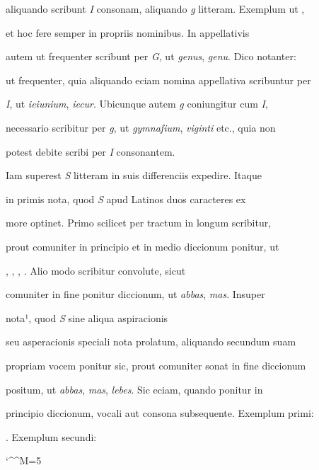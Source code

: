 aliquando scribunt \textit{I} consonam, aliquando \textit{g} litteram. Exemplum ut ,

 et hoc fere semper in propriis nominibus. In appellativis

autem ut frequenter scribunt per \textit{G}, ut \textit{genus}, \textit{genu}. Dico notanter:

ut frequenter, quia aliquando eciam nomina appellativa scribuntur per 

\textit{I}, ut \textit{ieiunium}, \textit{iecur}. Ubicunque autem \textit{g} coniungitur cum \textit{I},

necessario scribitur per \textit{g}, ut \textit{gymnaſium}, \textit{viginti} etc., quia non


potest debite scribi per \textit{I} consonantem.


\indentK Iam superest \textit{S} litteram in suis differenciis expedire. Itaque 

\fulllines

in primis nota, quod \textit{S} apud Latinos duos caracteres ex

more optinet. Primo scilicet per tractum in longum scribitur, 

prout comuniter in principio et in medio diccionum ponitur, ut 

, , , . Alio modo scribitur convolute, sicut 

comuniter in fine ponitur diccionum, ut \textit{abbas}, \textit{mas}. Insuper 

nota¹, quod \textit{S} sine aliqua aspiracionis 

seu asperacionis speciali nota prolatum, aliquando secundum suam 

propriam vocem ponitur sic, prout comuniter sonat in fine diccionum

positum, ut \textit{abbas}, \textit{mas}, \textit{lebes}. Sic eciam, quando ponitur in

principio diccionum, vocali aut consona subsequente. Exemplum primi: 

    . Exemplum secundi: 

\splitlines 

\catcode `\^^M=5 
\obeylines

